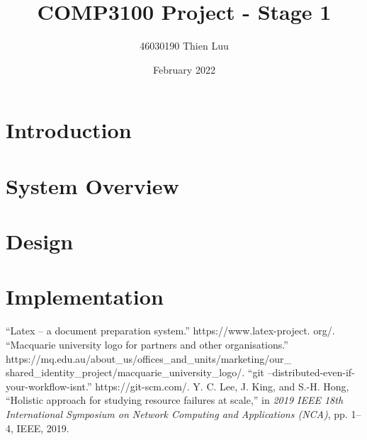 \documentclass{article}
\title{COMP3100 Project - Stage 1}
\author{46030190 Thien Luu}
\date{February 2022}
\begin{document}
\maketitle

\tableofcontents

\section{Introduction}

\maketitle

\section{System Overview}

\section{Design}

\section{Implementation}

\begin{thebibliography}{9}
    “Latex – a document preparation system.” https://www.latex-project.
    org/.
    “Macquarie university logo for partners and other organisations.”
    https://mq.edu.au/about\_us/offices\_and\_units/marketing/our\_
    shared\_identity\_project/macquarie\_university\_logo/.
    “git –distributed-even-if-your-workflow-isnt.” https://git-scm.com/.
    Y. C. Lee, J. King, and S.-H. Hong, “Holistic approach for studying resource
    failures at scale,” in \textit{2019 IEEE 18th International Symposium on Network
    Computing and Applications (NCA)}, pp. 1–4, IEEE, 2019.
\end{thebibliography}

\end{document}
